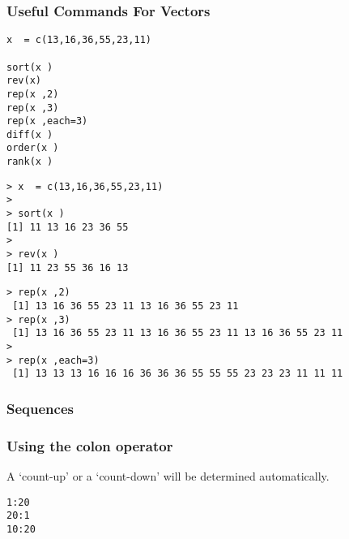 %
\begin{frame}[fragile]
\frametitle{Useful Commands For Vectors}

\begin{framed}
\begin{verbatim}
x  = c(13,16,36,55,23,11)

sort(x )
rev(x)
rep(x ,2)
rep(x ,3)
rep(x ,each=3)
diff(x )
order(x )
rank(x )
\end{verbatim}
\end{framed}
\end{frame}
\begin{frame}[fragile]
\begin{framed}
\begin{verbatim}
> x  = c(13,16,36,55,23,11)
>
> sort(x )
[1] 11 13 16 23 36 55
>
> rev(x )
[1] 11 23 55 36 16 13
\end{verbatim}
\end{framed}
\end{frame}
\begin{frame}[fragile]
\begin{framed}
\begin{verbatim}
> rep(x ,2)
 [1] 13 16 36 55 23 11 13 16 36 55 23 11
> rep(x ,3)
 [1] 13 16 36 55 23 11 13 16 36 55 23 11 13 16 36 55 23 11
>
> rep(x ,each=3)
 [1] 13 13 13 16 16 16 36 36 36 55 55 55 23 23 23 11 11 11
 \end{verbatim}
\end{framed}
\end{frame}
\begin{frame}[fragile]

\frametitle{Sequences}
\frametitle{Using the colon operator}
A `count-up' or a `count-down' will be determined automatically.
\begin{framed}
\begin{verbatim}
1:20
20:1
10:20
\end{verbatim}
\end{framed}
\end{frame}
